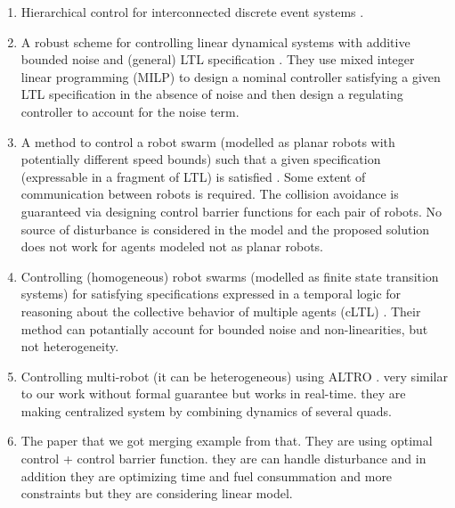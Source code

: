 \begin{enumerate}
	\item Hierarchical control for interconnected discrete event systems \cite{wong1996hierarchical,schmidt2008nonblocking}.
	\item A robust scheme for controlling linear dynamical systems with additive bounded noise and (general) LTL specification \cite{Yang2017milp}. They use mixed integer linear programming (MILP) to design a nominal controller satisfying a given LTL specification in the absence of noise and then design a regulating controller to account for the noise term.
	\item A method to control a robot swarm (modelled as planar robots with potentially different speed bounds) such that a given specification (expressable in a fragment of LTL) is satisfied \cite{Chen2018cbf}. Some extent of communication between robots is required. The collision avoidance is guaranteed via designing control barrier functions for each pair of robots. No source of disturbance is considered in the model and the proposed solution does not work for agents modeled not as planar robots.
	\item Controlling (homogeneous) robot swarms (modelled as finite state transition systems) for satisfying specifications expressed in a temporal logic for reasoning about the collective behavior of multiple agents (cLTL) \cite{Shahin2017cltl}. Their method can potantially account for bounded noise and non-linearities, but not heterogeneity.
	\item Controlling multi-robot (it can be heterogeneous) using ALTRO \cite{jackson2020scalable}. very similar to our work without formal guarantee but works in real-time. they are making centralized system by combining dynamics of several quads. 
	\item The paper that we got merging example from that\cite{xiao2019merging}. They are using optimal control + control barrier function. they are can handle disturbance and in addition they are optimizing time and fuel consummation and more constraints but they are considering linear model.
\end{enumerate}
